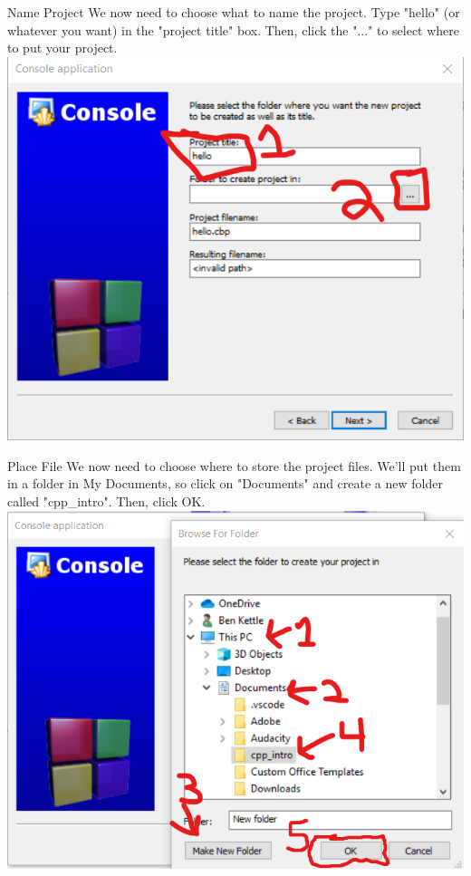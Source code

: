 \documentclass{beamer}
\begin{document}
\begin{frame}{Name Project}
We now need to choose what to name the project. Type "hello" (or whatever you want) in the "project title" box. Then, click the "..." to select where to put your project.
\includegraphics[scale=.5]{codeblockssetup3.png}
    
\end{frame}

\begin{frame}{Place File}
We now need to choose where to store the project files. We'll put them in a folder in My Documents, so click on "Documents" and create a new folder called "cpp_intro". Then, click OK.
\includegraphics[scale=.45]{codeblockssetup4.png}
    
\end{frame}
\end{document}
